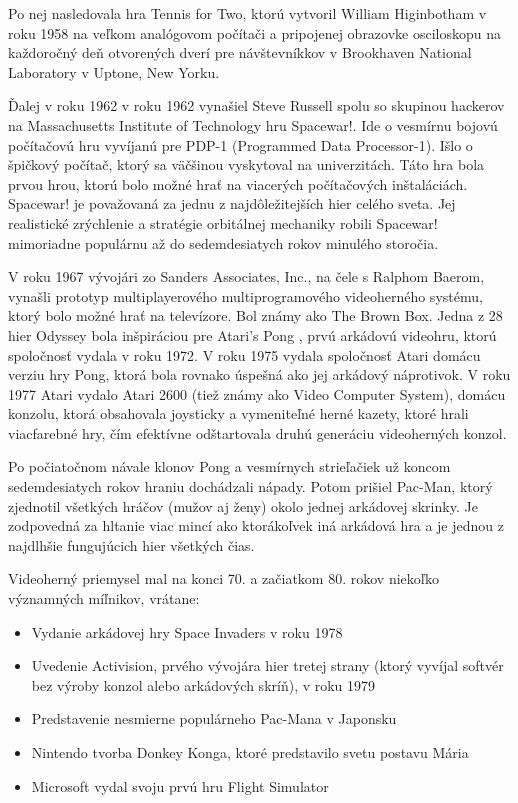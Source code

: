 \documentclass[10pt,oneside,slovak,a4paper]{article}
\begin{document}
Po nej nasledovala hra Tennis for Two, ktorú vytvoril William Higinbotham v roku 1958 na veľkom analógovom počítači a pripojenej obrazovke osciloskopu na každoročný deň otvorených dverí pre návštevníkkov v Brookhaven National Laboratory v Uptone, New Yorku. 

Ďalej v roku 1962 v roku 1962 vynašiel Steve Russell spolu so skupinou hackerov na Massachusetts Institute of Technology hru Spacewar!. Ide o vesmírnu bojovú počítačovú hru vyvíjanú pre PDP-1 (Programmed Data Processor-1). Išlo o špičkový počítač, ktorý sa väčšinou vyskytoval na univerzitách. Táto hra bola prvou hrou, ktorú bolo možné hrať na viacerých počítačových inštaláciách. Spacewar! je považovaná za jednu z najdôležitejších hier celého sveta. Jej realistické zrýchlenie a stratégie orbitálnej mechaniky robili Spacewar! mimoriadne populárnu až do sedemdesiatych rokov minulého storočia.~\cite{Kinephanos:2015}

V roku 1967 vývojári zo Sanders Associates, Inc., na čele s Ralphom Baerom, vynašli prototyp multiplayerového multiprogramového videoherného systému, ktorý bolo možné hrať na televízore. Bol známy ako The Brown Box. Jedna z 28 hier Odyssey bola inšpiráciou pre Atari's Pong , prvú arkádovú videohru, ktorú spoločnosť vydala v roku 1972. V roku 1975 vydala spoločnosť Atari domácu verziu hry Pong, ktorá bola rovnako úspešná ako jej arkádový náprotivok. V roku 1977 Atari vydalo Atari 2600 (tiež známy ako Video Computer System), domácu konzolu, ktorá obsahovala joysticky a vymeniteľné herné kazety, ktoré hrali viacfarebné hry, čím efektívne odštartovala druhú generáciu videoherných konzol.

Po počiatočnom návale klonov Pong a vesmírnych strieľačiek už koncom sedemdesiatych rokov hraniu dochádzali nápady. Potom prišiel Pac-Man, ktorý zjednotil všetkých hráčov (mužov aj ženy) okolo jednej arkádovej skrinky. Je zodpovedná za hltanie viac mincí ako ktorákoľvek iná arkádová hra a je jednou z najdlhšie fungujúcich hier všetkých čias.

Videoherný priemysel mal na konci 70. a začiatkom 80. rokov niekoľko významných míľnikov, vrátane:
\begin{itemize}
\item Vydanie arkádovej hry Space Invaders v roku 1978
\item Uvedenie Activision, prvého vývojára hier tretej strany (ktorý vyvíjal softvér bez výroby konzol alebo arkádových skríň), v roku 1979
\item Predstavenie nesmierne populárneho Pac-Mana v Japonsku
\item Nintendo tvorba Donkey Konga, ktoré predstavilo svetu postavu Mária
\item Microsoft vydal svoju prvú hru Flight Simulator
\end{itemize}
\end{document}
